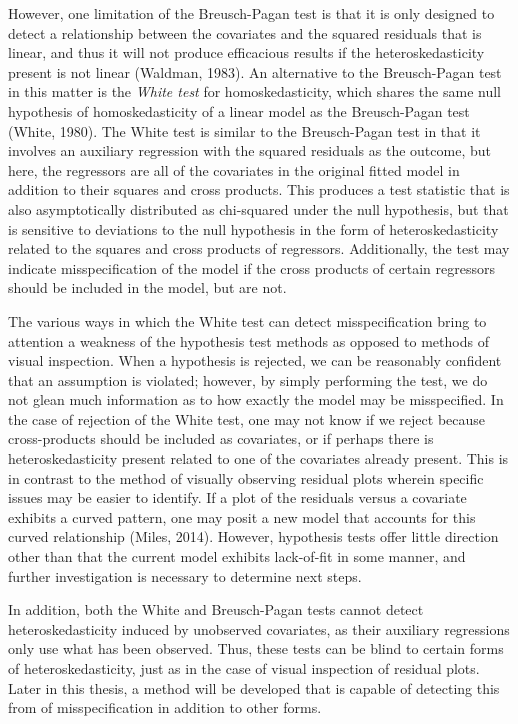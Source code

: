 		However, one limitation of the Breusch-Pagan test is that it is only designed to detect a relationship between the covariates and the squared residuals that is linear, and thus it will not
		produce efficacious results if the heteroskedasticity present is not linear (Waldman, 1983). An alternative to the Breusch-Pagan test in this matter is the \textit{White test} for homoskedasticity,
		which shares the same null hypothesis of homoskedasticity of a linear model as the Breusch-Pagan test (White, 1980). The White test is similar to the Breusch-Pagan test in that it involves
		an auxiliary regression with the squared residuals as the outcome, but here, the regressors are all of the covariates in the original fitted model in addition to their squares and cross
		products. This produces a test statistic that is also asymptotically distributed as chi-squared under the null hypothesis, but that is sensitive to deviations to the null hypothesis in the form of
		heteroskedasticity related to the squares and cross products of regressors. Additionally, the test may indicate misspecification of the model if the cross products of certain
		regressors should be included in the model, but are not.

		The various ways in which the White test can detect misspecification bring to attention a weakness of the hypothesis test methods as opposed to methods of visual inspection.
		When a hypothesis is rejected, we can be reasonably confident that an assumption is violated; however, by simply performing the test, we do not glean much information as to how exactly the
		model may be misspecified. In the case of rejection of the White test, one may not know if we reject because cross-products should be included as covariates, or if perhaps there is heteroskedasticity
		present related to one of the covariates already present. This is in contrast to the method of visually observing residual plots wherein specific issues may be easier to identify.
		If a plot of the residuals versus a covariate exhibits a curved pattern, one may posit a new model that accounts for this curved relationship (Miles, 2014).
		However, hypothesis tests offer little direction other than that the current model exhibits lack-of-fit in some manner, and further investigation is necessary to determine next steps.

		In addition, both the White and Breusch-Pagan tests cannot detect heteroskedasticity induced by unobserved covariates, as their auxiliary regressions only use what has been observed.
		Thus, these tests can be blind to certain forms of heteroskedasticity, just as in the case of visual inspection of residual plots. Later in this thesis, a method will be developed
		that is capable of detecting this from of misspecification in addition to other forms.

